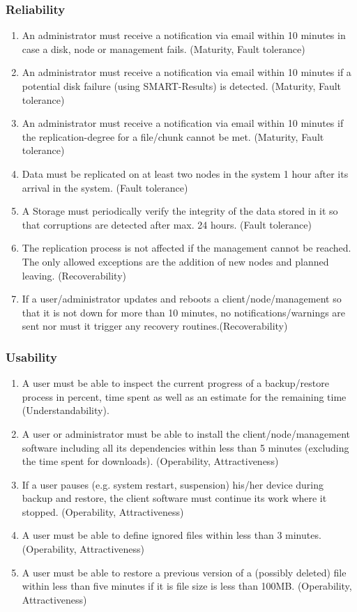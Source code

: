 \subsubsection{Reliability}

\begin{enumerate}
	\enumcountrestore
	\item An administrator must receive a notification via email within 10 minutes in case a disk, node or management fails. (Maturity, Fault tolerance)
	\item An administrator must receive a notification via email within 10 minutes if a potential disk failure (using SMART-Results) is detected. (Maturity, Fault tolerance)
	\item An administrator must receive a notification via email within 10 minutes if the replication-degree for a file/chunk cannot be met. (Maturity, Fault tolerance)
	\item Data must be replicated on at least two nodes in the system 1 hour after its arrival in the system. (Fault tolerance)
	\item A Storage must periodically verify the integrity of the data stored in it so that corruptions are detected after max. 24 hours. (Fault tolerance)
	\item The replication process is not affected if the management cannot be reached. The only allowed exceptions are the addition of new nodes and planned leaving. (Recoverability)
	\item If a user/administrator updates and reboots a client/node/management so that it is not down for more than 10 minutes, no notifications/warnings are sent nor must it trigger any recovery routines.(Recoverability)
	\enumcountsave
\end{enumerate}

\subsubsection{Usability}
\begin{enumerate}
	\enumcountrestore
	\item A user must be able to inspect the current progress of a backup/restore process in percent, time spent as well as an estimate for the remaining time (Understandability).
	\item A user or administrator must be able to install the client/node/management software including all its dependencies within less than 5 minutes (excluding the time spent for downloads). (Operability, Attractiveness)
	\item If a user pauses (e.g. system restart, suspension) his/her device during backup and restore, the client software must continue its work where it stopped. (Operability, Attractiveness)
	\item A user must be able to define ignored files within less than 3 minutes. (Operability, Attractiveness)
	\item A user must be able to restore a previous version of a (possibly deleted) file within less than five minutes if it is file size is less than 100MB. (Operability, Attractiveness)
	\enumcountsave
\end{enumerate}

